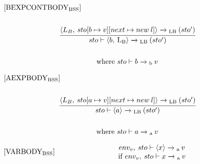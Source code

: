\begin{equation}
\begin{split}
\begin{minipage}{\linewidth}
$[\text{BEXPCONTBODY}_\text{BSS}]$
\end{minipage}
\\\\
\begin{minipage}{\linewidth}
\centering
$\cfrac{\langle L_B, \: sto[b \mapsto v][next \mapsto new \: l]\rangle \xrightarrow{}\textsubscript{LB} \: (sto') }{sto \vdash \langle b, \: \text{L\textsubscript{B}} \rangle \xrightarrow{}\textsubscript{LB} \: (sto')}$
\end{minipage}
\\\\
\begin{minipage}{\linewidth}
\centering
where $sto \vdash b \xrightarrow{}\textsubscript{b} \: v$
\end{minipage}
\end{split}
\end{equation}

\begin{equation}
\begin{split}
\begin{minipage}{\linewidth}
$[\text{AEXPBODY}_\text{BSS}]$
\end{minipage}
\\\\
\begin{minipage}{\linewidth}
\centering
$\cfrac{\langle L_B, \: sto[a \mapsto v][next \mapsto new \: l]\rangle \xrightarrow{}\textsubscript{LB} \: (sto') }{sto \vdash \langle a \rangle \xrightarrow{}\textsubscript{LB} \: (sto')}$
\end{minipage}
\\\\
\begin{minipage}{\linewidth}
\centering
where $sto \vdash a \xrightarrow{}\textsubscript{a} \: v$
\end{minipage}
\end{split}
\end{equation}

\begin{equation}
\begin{minipage}{.2\linewidth}
    $[\text{VARBODY}_\text{BSS}]$
\end{minipage}
\\
\begin{minipage}{.8\linewidth}
\centering
$env_v, \: sto \vdash \langle x \rangle \xrightarrow{}\textsubscript{a} \: v $
\\
if $env_v, \: sto \vdash x \xrightarrow{} \textsubscript{a} \: v$
\end{minipage}
\end{equation}

